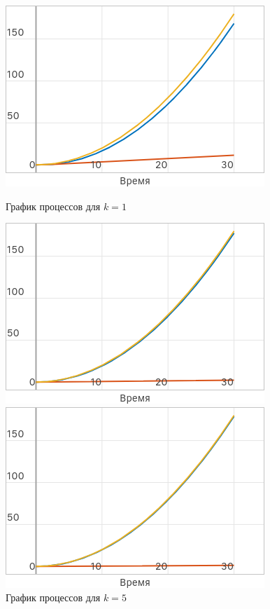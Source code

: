 \documentclass[a4paper]{article}
\begin{document}
\begin{figure}[H]
    \centering
    \begin{minipage}{0.32\textwidth}
        \includegraphics[width=\textwidth]{sources/task2_at2_k=1.png}
        \caption*{График процессов для $k = 1$}
    \end{minipage}
    \hfill
    \begin{minipage}{0.32\textwidth}
        \includegraphics[width=\textwidth]{sources/task2_at2_k=5.png}
        \caption*{График процессов для $k = 5$}
    \end{minipage}
    \hfill
    \begin{minipage}{0.32\textwidth}
        \includegraphics[width=\textwidth]{sources/task2_at2_k=10.png}

\end{minipage}
\end{figure}
\end{document}
